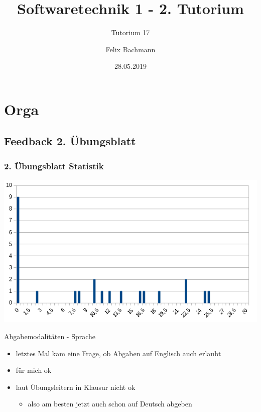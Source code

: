 \documentclass[18pt]{beamer}
\title[SWT1]{Softwaretechnik 1 - 2. Tutorium}
\subtitle{Tutorium 17}
\author{Felix Bachmann}
\date{28.05.2019}
\institute{KIT - Institut für Programmstrukturen und Datenorganisation (IPD)}
\begin{document}

\begin{frame}
\titlepage
\end{frame}

\section{Orga}
	\subsection{Feedback 2. Übungsblatt}
	\begin{frame}
		\frametitle{2. Übungsblatt Statistik}
		\includegraphics[scale=0.7]{./pics/tut2/statistics-ub2.png}
	\end{frame}

	
\begin{frame}{Abgabemodalitäten - Sprache}
	\begin{itemize}
		\item letztes Mal kam eine Frage, ob Abgaben auf Englisch auch erlaubt
		\item für mich ok
		\item laut Übungsleitern in Klausur nicht ok
		\begin{itemize}
			\item also am besten jetzt auch schon auf Deutsch abgeben
		\end{itemize}
	\end{itemize}	
\end{frame}
\end{document}
